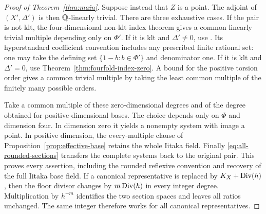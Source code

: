 \begin{proof}[Proof of Theorem~\ref{thm:main}]
Suppose instead that $Z$ is a point. The adjoint of $(X',\Delta')$
is then \(\mathbb Q\)-linearly trivial. There are three exhaustive cases.
If the pair is not klt, the four-dimensional non-klt index theorem
\cite[Corollary~1.7]{JiangLiu2021} gives a common linearly trivial
multiple depending only on $\Phi'$. If it is klt and
$\Delta'\ne0$, use \cite[Theorem~1.14]{Xu2019}. Its hyperstandard
coefficient convention includes any prescribed finite rational set:
one may take the defining set $\{1-b:b\in\Phi'\}$ and denominator
one. If it is klt and $\Delta'=0$, use
Theorem~\ref{thm:fourfold-index-zero}. A bound for the positive
torsion order gives a common trivial multiple by taking the least
common multiple of the finitely many possible orders.

Take a common multiple of these zero-dimensional degrees and of the
degree obtained for positive-dimensional bases. The choice depends
only on $\Phi$ and dimension four. In dimension zero it yields a
nonempty system with image a point. In positive dimension,
the every-multiple clause of Proposition~\ref{prop:effective-base}
retains the whole Iitaka field.
Finally \eqref{eq:all-rounded-sections} transfers the complete
systems back to the original pair. This proves every assertion,
including the rounded reflexive convention and recovery of the
full Iitaka base field. If a canonical representative is replaced by
$K_X+\operatorname{Div}(h)$, then the floor divisor changes by $m\operatorname{Div}(h)$ in
every integer degree. Multiplication by $h^{-m}$ identifies the two
section spaces and leaves all ratios unchanged. The same integer
therefore works for all canonical representatives.
\end{proof}
